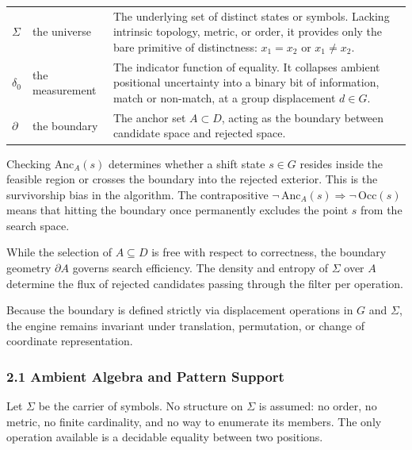 \begin{center}
  \begin{tabular}{@{}p{2.2em}p{7.5em}p{}@{}}
    \toprule
    $\Sigma$   & the universe    &
      The underlying set of distinct states or symbols. Lacking intrinsic topology, metric, or
      order, it provides only the bare primitive of distinctness: $x_1 = x_2$ or $x_1 \neq x_2$. \\
    \addlinespace[0.7em]
    $\delta_0$ & the measurement &
      The indicator function of equality. It collapses ambient positional uncertainty into a
      binary bit of information, match or non-match, at a group displacement $d \in G$. \\
    \addlinespace[0.7em]
    $\partial$ & the boundary    &
      The anchor set $A \subset D$, acting as the boundary between candidate space and rejected
      space. \\
    \bottomrule
  \end{tabular}
\end{center}

Checking $\mathrm{Anc}_A(s)$ determines whether a shift state $s \in G$ resides inside the feasible
region or crosses the boundary into the rejected exterior. This is the survivorship bias in the
algorithm. The contrapositive $\neg\,\mathrm{Anc}_A(s) \Longrightarrow \neg\,\mathrm{Occ}(s)$ means
that hitting the boundary once permanently excludes the point $s$ from the search space.

While the selection of $A \subseteq D$ is free with respect to correctness, the boundary geometry
$\partial A$ governs search efficiency. The density and entropy of $\Sigma$ over $A$ determine the
flux of rejected candidates passing through the filter per operation.

Because the boundary is defined strictly via displacement operations in $G$ and $\Sigma$, the
engine remains invariant under translation, permutation, or change of coordinate representation.

\subsubsection{2.1 Ambient Algebra and Pattern Support}

Let \(\Sigma\) be the carrier of symbols. No structure on \(\Sigma\) is assumed: no order, no metric, no finite cardinality, and no way to enumerate its members. The only operation available is a decidable equality between two positions.

